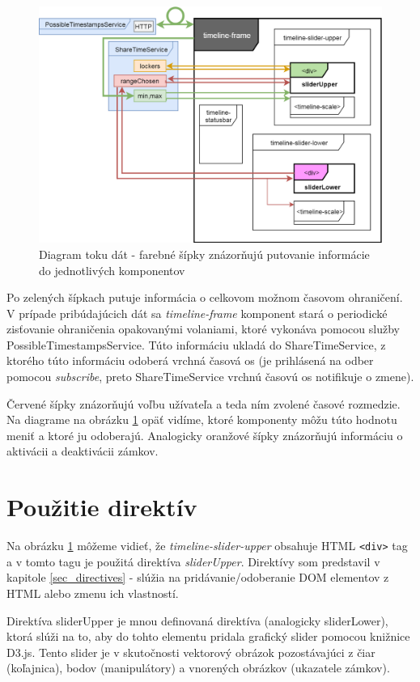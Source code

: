 \documentclass[
  printed, %
  twoside, %
  notable,   %
  nolof,   %
  nolot,   %
]{fithesis3}
\begin{document}
\begin{figure}[H]
	\center
	\includegraphics[width=1.0\linewidth]{data_diagram}
	\caption{Diagram toku dát - farebné šípky znázorňujú putovanie informácie do jednotlivých komponentov}
	\label{data_diagram}
\end{figure}

Po zelených šípkach putuje informácia o celkovom možnom časovom ohraničení. V prípade pribúdajúcich dát sa \textit{timeline-frame} komponent stará o periodické zisťovanie ohraničenia opakovanými volaniami, ktoré vykonáva pomocou služby PossibleTimestampsService. Túto informáciu ukladá do ShareTimeService, z ktorého túto informáciu odoberá vrchná časová os (je prihlásená na odber pomocou \textit{subscribe}, preto ShareTimeService vrchnú časovú os notifikuje o zmene).

Červené šípky znázorňujú voľbu užívateľa a teda ním zvolené časové rozmedzie. Na diagrame na obrázku \ref{data_diagram} opäť vidíme, ktoré komponenty môžu túto hodnotu meniť a ktoré ju odoberajú. Analogicky oranžové šípky znázorňujú informáciu o aktivácii a deaktivácii zámkov.

\section{Použitie direktív}
Na obrázku \ref{data_diagram} môžeme vidieť, že \textit{timeline-slider-upper} obsahuje HTML \texttt{<div>} tag a v tomto tagu je použitá direktíva \textit{sliderUpper}. Direktívy som predstavil v kapitole \ref{sec_directives} - slúžia na pridávanie/odoberanie DOM elementov z HTML alebo zmenu ich vlastností.

Direktíva sliderUpper je mnou definovaná direktíva (analogicky sliderLower), ktorá slúži na to, aby do tohto elementu pridala grafický slider pomocou knižnice D3.js. Tento slider je v skutočnosti vektorový obrázok pozostávajúci z čiar (koľajnica), bodov (manipulátory) a vnorených obrázkov (ukazatele zámkov).
\end{document}
